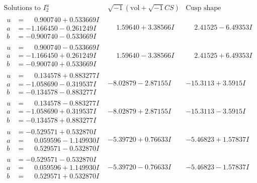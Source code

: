 \documentclass[1p]{elsarticle_modified}
\theoremstyle{definition}
\newcommand{\I}{\sqrt{-1}}
\begin{document}
$$\begin{array}{c|c|c}  
\text{Solutions to }I^u_{2}& \I (\text{vol} + \sqrt{-1}CS) & \text{Cusp shape}\\
 \hline 
\begin{aligned}
u &= \phantom{-}0.900740 + 0.533669 I \\
a &= -1.166450 - 0.261249 I \\
b &= -0.900740 - 0.533669 I\end{aligned}
 & \phantom{-}1.59640 + 3.38566 I & \phantom{-}2.41525 - 6.49353 I \\ \hline\begin{aligned}
u &= \phantom{-}0.900740 - 0.533669 I \\
a &= -1.166450 + 0.261249 I \\
b &= -0.900740 + 0.533669 I\end{aligned}
 & \phantom{-}1.59640 - 3.38566 I & \phantom{-}2.41525 + 6.49353 I \\ \hline\begin{aligned}
u &= \phantom{-}0.134578 + 0.883277 I \\
a &= -1.058690 - 0.319537 I \\
b &= -0.134578 - 0.883277 I\end{aligned}
 & -8.02879 - 2.87155 I & -15.3113 + 3.5915 I \\ \hline\begin{aligned}
u &= \phantom{-}0.134578 - 0.883277 I \\
a &= -1.058690 + 0.319537 I \\
b &= -0.134578 + 0.883277 I\end{aligned}
 & -8.02879 + 2.87155 I & -15.3113 - 3.5915 I \\ \hline\begin{aligned}
u &= -0.529571 + 0.532870 I \\
a &= \phantom{-}0.059596 - 1.149930 I \\
b &= \phantom{-}0.529571 - 0.532870 I\end{aligned}
 & -5.39720 + 0.76633 I & -5.46823 + 1.57837 I \\ \hline\begin{aligned}
u &= -0.529571 - 0.532870 I \\
a &= \phantom{-}0.059596 + 1.149930 I \\
b &= \phantom{-}0.529571 + 0.532870 I\end{aligned}
 & -5.39720 - 0.76633 I & -5.46823 - 1.57837 I \\ \hline\begin{aligned}

\end{aligned}
\end{array}$$
\end{document}
